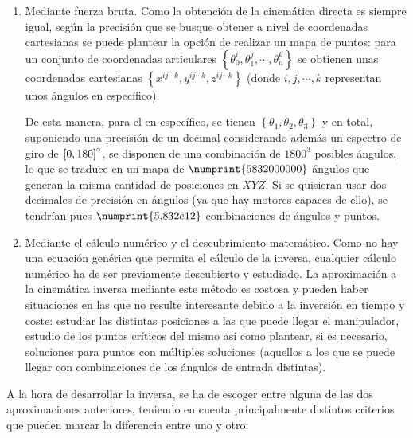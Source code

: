 \begin{enumerate}
    \item Mediante fuerza bruta. Como la obtención de la cinemática directa es siempre
          igual, según la precisión que se busque obtener a nivel de coordenadas cartesianas
          se puede plantear la opción de realizar un mapa de puntos: para un conjunto de
          coordenadas articulares $\left\{\theta_0^i,\theta_1^j,\cdots,\theta_n^k\right\}$ se
          obtienen unas coordenadas cartesianas
          $\left\{x^{ij\cdots k}, y^{ij\cdots k}, z^{ij\cdots k}\right\}$
          (donde $i,j,\cdots,k$ representan unos ángulos en específico).

          De esta manera, para el \pArm{} en específico, se tienen
          $\left\{\theta_1, \theta_2, \theta_3\right\}$ y en total, suponiendo una precisión
          de un decimal considerando además un espectro de giro de $\left[0,180\right]\degree$,
          se disponen de una combinación de $1800^3$ posibles ángulos, lo que se traduce
          en un mapa de $\numprint{5832000000}$ ángulos que generan la misma cantidad de posiciones
          en $XYZ$. Si se quisieran usar dos decimales de precisión en ángulos (ya que hay motores capaces
          de ello), se tendrían pues $\numprint{5.832e12}$ combinaciones de ángulos y puntos.

    \item Mediante el cálculo numérico y el descubrimiento matemático. Como no hay una
          ecuación genérica que permita el cálculo de la inversa, cualquier cálculo numérico ha
          de ser previamente descubierto y estudiado. La aproximación a la cinemática inversa
          mediante este método es costosa y pueden haber situaciones en las que no resulte
          interesante debido a la inversión en tiempo y coste: estudiar las distintas posiciones
          a las que puede llegar el manipulador, estudio de los puntos críticos del mismo
          así como plantear, si es necesario, soluciones para puntos con múltiples soluciones
          (aquellos a los que se puede llegar con combinaciones de los ángulos de entrada
          distintas).
\end{enumerate}

A la hora de desarrollar la inversa, se ha de escoger entre alguna de las dos aproximaciones
anteriores, teniendo en cuenta principalmente distintos criterios que pueden marcar la
diferencia entre uno y otro:

